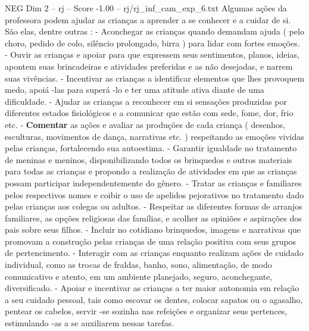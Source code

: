 \begin{textsample}{NEG Dim 2 – rj – Score -1.00 – rj/rj\_inf\_cam\_exp\_6.txt}
Algumas ações da professora podem ajudar as crianças a aprender a se conhecer e a cuidar de si.
São elas, dentre outras : - Aconchegar as crianças quando demandam ajuda ( pelo choro, pedido de colo, silêncio prolongado, birra ) para lidar com fortes emoções. - Ouvir as crianças e apoiar para que expressem seus sentimentos, planos, ideias, apontem suas brincadeiras e atividades preferidas e as não desejadas, e narrem suas vivências. - Incentivar as crianças a identificar elementos que lhes provoquem medo, apoiá -las para superá -lo e ter uma atitude ativa diante de uma dificuldade. - Ajudar as crianças a reconhecer em si sensações produzidas por diferentes estados fisiológicos e a comunicar que estão com sede, fome, dor, frio etc. - \textbf{Comentar} as ações e avaliar as produções de cada criança ( desenhos, esculturas, movimentos de dança, narrativas etc. ) respeitando as emoções vividas pelas crianças, fortalecendo sua autoestima. - Garantir igualdade no tratamento de meninas e meninos, disponibilizando todos os brinquedos e outros materiais para todas as crianças e propondo a realização de atividades em que as crianças possam participar independentemente do gênero. - Tratar as crianças e familiares pelos respectivos nomes e coibir o uso de apelidos pejorativos no tratamento dado pelas crianças aos colegas ou adultos. - Respeitar as diferentes formas de arranjos familiares, as opções religiosas das famílias, e acolher as opiniões e aspirações dos pais sobre seus filhos. - Incluir no cotidiano brinquedos, imagens e narrativas que promovam a construção pelas crianças de uma relação positiva com seus grupos de pertencimento. - Interagir com as crianças enquanto realizam ações de cuidado individual, como as trocas de fraldas, banho, sono, alimentação, de modo comunicativo e atento, em um ambiente planejado, seguro, aconchegante, diversificado. - Apoiar e incentivar as crianças a ter maior autonomia em relação a seu cuidado pessoal, tais como escovar os dentes, colocar sapatos ou o agasalho, pentear os cabelos, servir -se sozinha nas refeições e organizar seus pertences, estimulando -as a se auxiliarem nessas tarefas.

\end{textsample}
